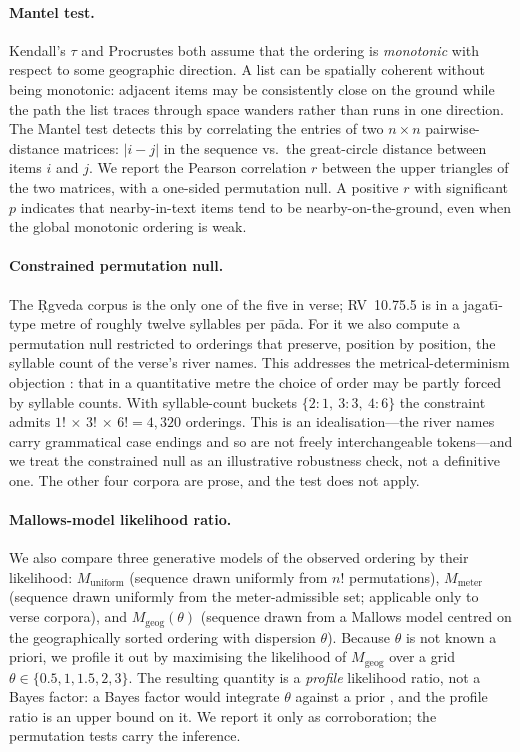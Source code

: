 \documentclass[11pt]{article}
\begin{document}
\paragraph{Mantel test.}
Kendall's $\tau$ and Procrustes both assume that the ordering is
\emph{monotonic} with respect to some geographic direction. A list
can be spatially coherent without being monotonic: adjacent items
may be consistently close on the ground while the path the list
traces through space wanders rather than runs in one direction. The
Mantel test \citep{mantel1967} detects this by correlating the
entries of two $n\times n$ pairwise-distance matrices: $|i-j|$ in the
sequence vs.\ the great-circle distance between items $i$ and $j$. We
report the Pearson correlation $r$ between the upper triangles of the
two matrices, with a one-sided permutation null. A positive $r$ with
significant $p$ indicates that nearby-in-text items tend to be
nearby-on-the-ground, even when the global monotonic ordering is
weak.

\paragraph{Constrained permutation null.}
The Ṛgveda corpus is the only one of the five in verse; RV~10.75.5 is
in a jagat\={\i}-type metre of roughly twelve syllables per p\={a}da.
For it we also compute a permutation null restricted to orderings
that preserve, position by position, the syllable count of the
verse's river names. This addresses the metrical-determinism
objection \citep{arnold1905}: that in a quantitative metre the choice
of order may be partly forced by syllable counts. With syllable-count
buckets $\{2:1,\ 3:3,\ 4:6\}$ the constraint admits
$1!\,\times\,3!\,\times\,6! = 4{,}320$ orderings. This is an
idealisation---the river names carry grammatical case endings and so
are not freely interchangeable tokens---and we treat the constrained
null as an illustrative robustness check, not a definitive one. The
other four corpora are prose, and the test does not apply.

\paragraph{Mallows-model likelihood ratio.}
We also compare three generative models of the observed ordering by
their likelihood: $M_\text{uniform}$ (sequence drawn uniformly from
$n!$ permutations), $M_\text{meter}$ (sequence drawn uniformly from
the meter-admissible set; applicable only to verse corpora), and
$M_\text{geog}(\theta)$ (sequence drawn from a Mallows model
\citep{mallows1957, flignerverducci1986} centred on the
geographically sorted ordering with dispersion $\theta$). Because
$\theta$ is not known a priori, we profile it out by maximising the
likelihood of $M_\text{geog}$ over a grid
$\theta \in \{0.5, 1, 1.5, 2, 3\}$. The resulting quantity is a
\emph{profile} likelihood ratio, not a Bayes factor: a Bayes factor
would integrate $\theta$ against a prior \citep{kassraftery1995}, and
the profile ratio is an upper bound on it. We report it only as
corroboration; the permutation tests carry the inference.
\end{document}
